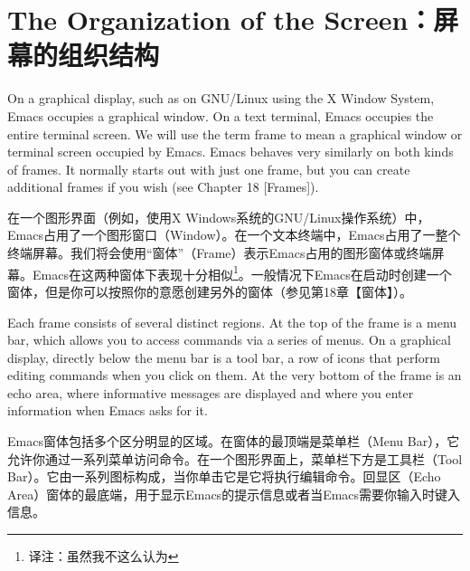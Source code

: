\chapter{The Organization of the Screen：屏幕的组织结构}
On a graphical display, such as on GNU/Linux using the X Window System, Emacs occupies
a graphical window. On a text terminal, Emacs occupies the entire terminal screen. We
will use the term frame to mean a graphical window or terminal screen occupied by Emacs.
Emacs behaves very similarly on both kinds of frames. It normally starts out with just one
frame, but you can create additional frames if you wish (see Chapter 18 [Frames]).
\par
在一个图形界面（例如，使用X Windows系统的GNU/Linux操作系统）中，Emacs占用了一个图形窗口（Window）。在一个文本终端中，Emacs占用了一整个终端屏幕。我们将会使用“窗体”（Frame）表示Emacs占用的图形窗体或终端屏幕。Emacs在这两种窗体下表现十分相似\footnote{译注：虽然我不这么认为}。一般情况下Emacs在启动时创建一个窗体，但是你可以按照你的意愿创建另外的窗体（参见第18章【窗体】）。\par
Each frame consists of several distinct regions. At the top of the frame is a menu bar,
which allows you to access commands via a series of menus. On a graphical display, directly
below the menu bar is a tool bar, a row of icons that perform editing commands when you
click on them. At the very bottom of the frame is an echo area, where informative messages
are displayed and where you enter information when Emacs asks for it.
\par
Emacs窗体包括多个区分明显的区域。在窗体的最顶端是菜单栏（Menu Bar），它允许你通过一系列菜单访问命令。在一个图形界面上，菜单栏下方是工具栏（Tool Bar）。它由一系列图标构成，当你单击它是它将执行编辑命令。回显区（Echo Area）窗体的最底端，用于显示Emacs的提示信息或者当Emacs需要你输入时键入信息。\par
